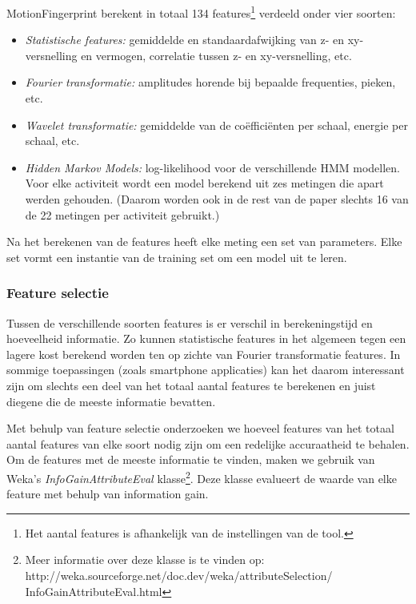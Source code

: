 \documentclass{article}
\begin{document}
MotionFingerprint berekent in totaal 134 features\footnote{Het aantal features is afhankelijk van de instellingen van de tool.} verdeeld onder vier soorten:
\begin{itemize}
\item \textit{Statistische features:} gemiddelde en standaardafwijking van z- en xy-versnelling en vermogen, correlatie tussen z- en xy-versnelling, etc. 
 
\item \textit{Fourier transformatie:} amplitudes horende bij bepaalde frequenties, pieken, etc.

\item \textit{Wavelet transformatie:} gemiddelde van de co\"effici\"enten per schaal, energie per schaal, etc.

\item \textit{Hidden Markov Models:} log-likelihood voor de verschillende HMM modellen. Voor elke activiteit wordt een model berekend uit zes metingen die apart werden gehouden. (Daarom worden ook in de rest van de paper slechts 16 van de 22 metingen per activiteit gebruikt.)
\end{itemize}


Na het berekenen van de features heeft elke meting een set van parameters. Elke set vormt een instantie van de training set om een model uit te leren.

\subsubsection{Feature selectie}
Tussen de verschillende soorten features is er verschil in berekeningstijd en hoeveelheid informatie. Zo kunnen statistische features in het algemeen tegen een lagere kost berekend worden ten op zichte van Fourier transformatie features. In sommige toepassingen (zoals smartphone applicaties) kan het daarom interessant zijn om slechts een deel van het totaal aantal features te berekenen en juist diegene die de meeste informatie bevatten.

Met behulp van feature selectie onderzoeken we hoeveel features van het totaal aantal features van elke soort nodig zijn om een redelijke accuraatheid te behalen. Om de features met de meeste informatie te vinden, maken we gebruik van Weka's \emph{InfoGainAttributeEval} klasse\footnote{Meer informatie over deze klasse is te vinden op: http://weka.sourceforge.net/doc.dev/weka/attributeSelection/
InfoGainAttributeEval.html}.
 Deze klasse evalueert de waarde van elke feature met behulp van information gain.
\end{document}
